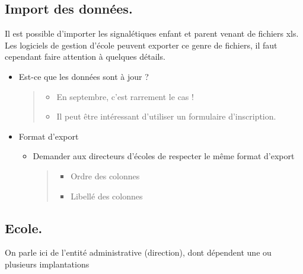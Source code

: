 \documentclass[letterpaper,10pt,english]{sphinxmanual}
\begin{document}
\subsection{Import des données.}
\label{checklist:import-des-donnees}
Il est possible d'importer les signalétiques enfant et parent venant de fichiers xls.
Les logiciels de gestion d'école peuvent exporter ce genre de fichiers, il faut cependant faire attention à quelques détails.
\begin{itemize}
\item {} 
Est-ce que les données sont à jour ?
\begin{quote}
\begin{itemize}
\item {} 
En septembre, c'est rarrement le cas !

\item {} 
Il peut être intéressant d'utiliser un formulaire d'inscription.

\end{itemize}

\end{quote}

\item {} 
Format d'export
\begin{itemize}
\item {} 
Demander aux directeurs d'écoles de respecter le même format d'export
\begin{quote}
\begin{itemize}
\item {} 
Ordre des colonnes

\item {} 
Libellé des colonnes

\end{itemize}

\end{quote}

\end{itemize}

\end{itemize}


\subsection{Ecole.}
\label{checklist:ecole}
On parle ici de l'entité administrative (direction), dont dépendent une ou plusieurs implantations
\end{document}
